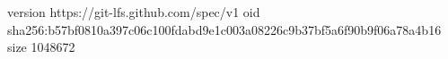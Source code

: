 version https://git-lfs.github.com/spec/v1
oid sha256:b57bf0810a397c06c100fdabd9e1c003a08226c9b37bf5a6f90b9f06a78a4b16
size 1048672
